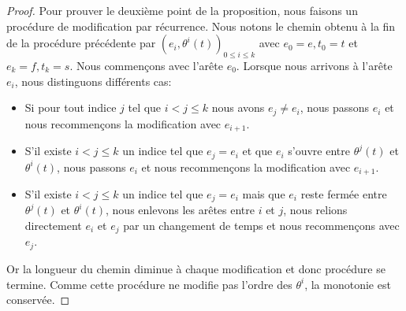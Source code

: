 \documentclass[titlepage,a4paper,12pt]{article}
\newcounter{th}
\newcounter{propo}
\begin{document}
\begin{proof}
Pour prouver le deuxième point de la proposition, nous faisons un procédure de modification par récurrence. Nous notons le chemin obtenu à la fin de la procédure précédente par $(e_i,\theta^i(t))_{0\leqslant i \leqslant k}$ avec $e_0 = e,t_0 = t$ et $e_k=f, t_k = s$. Nous commençons avec l'arête $e_0$. Lorsque nous arrivons à l'arête $e_i$, nous distinguons différents cas: 
\begin{itemize}[leftmargin = 0.4cm]
\item Si pour tout indice $j$ tel que $i<j\leqslant k$ nous avons $e_j\neq e_i$, nous passons $e_i$ et nous recommençons la modification avec $e_{i+1}$.
\item S'il existe $i<j\leqslant k$ un indice tel que $e_j=e_i$ et que $e_i$ s'ouvre entre $\theta^j(t)$ et $\theta^i(t)$, nous passons $e_i$ et nous recommençons la modification avec $e_{i+1}$.
\item S'il existe $i<j\leqslant k$ un indice tel que $e_j=e_i$ mais que $e_i$ reste fermée entre $\theta^j(t)$ et $\theta^i(t)$, nous enlevons les arêtes entre $i$ et $j$, nous relions directement $e_i$ et $e_j$ par un changement de temps et nous recommençons avec $e_j$. 
\end{itemize}
Or la longueur du chemin diminue à chaque modification et donc procédure se termine. Comme cette procédure ne modifie pas l'ordre des $\theta^i$, la monotonie est conservée.
\end{proof}
\end{document}
